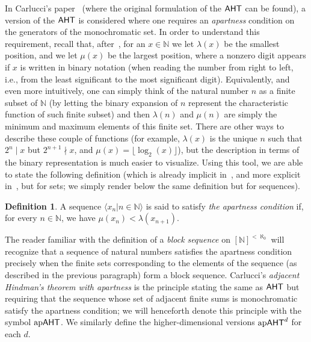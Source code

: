 \documentclass[11pt]{amsart}
\newcommand{\aht}{\mathnormal{\mathsf{AHT}}}
\newcommand{\apaht}{\mathnormal{\mathrm{ap}\mathsf{AHT}}}
\theoremstyle{definition}
\newtheorem{definition}[theorem]{Definition}
\begin{document}
In Carlucci's paper~\cite{carlucci-adjacent} (where the original formulation of the $\aht$ can be found), a version of the $\aht$ is considered where one requires an {\it apartness} condition on the generators of the monochromatic set. In order to understand this requirement, recall that, after~\cite{blass-hirst-simpson}, for an $x\in\mathbb N$ we let $\lambda(x)$ be the smallest position, and we let $\mu(x)$ be the largest position, where a nonzero digit appears if $x$ is written in binary notation (when reading the number from right to left, i.e., from the least significant to the most significant digit). Equivalently, and even more intuitively, one can simply think of the natural number $n$ as a finite subset of $\mathbb N$ (by letting the binary expansion of $n$ represent the characteristic function of such finite subset) and then $\lambda(n)$ and $\mu(n)$ are simply the minimum and maximum elements of this finite set. There are other ways to describe these couple of functions (for example, $\lambda(x)$ is the unique $n$ such that $2^n\mid x$ but $2^{n+1}\nmid x$, and $\mu(x)=\lfloor\log_2(x)\rfloor$), but the description in terms of the binary representation is much easier to visualize. Using this tool, we are able to state the following definition (which is already implicit in~\cite{blass-hirst-simpson}, and more explicit in~\cite[Definition 3]{carlucci-adjacent}, but for sets; we simply render below the same definition but for sequences).

\begin{definition}
A sequence $\langle x_n\big|n\in\mathbb N\rangle$ is said to satisfy {\it the apartness condition} if, for every $n\in\mathbb N$, we have $\mu(x_n)<\lambda(x_{n+1})$.
\end{definition}

The reader familiar with the definition of a {\it block sequence} on $[\mathbb N]^{<\aleph_0}$ will recognize that a sequence of natural numbers satisfies the apartness condition precisely when the finite sets corresponding to the elements of the sequence (as described in the previous paragraph) form a block sequence. Carlucci's {\it adjacent Hindman's theorem with apartness} is the principle stating the same as $\aht$ but requiring that the sequence whose set of adjacent finite sums is monochromatic satisfy the apartness condition; we will henceforth denote this principle with the symbol $\apaht$. We similarly define the higher-dimensional versions $\apaht^d$ for each $d$.
\end{document}
